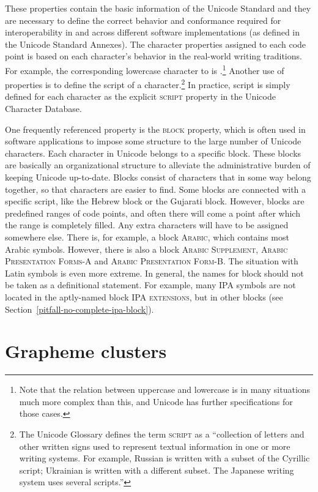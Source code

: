 These properties contain the basic information of the Unicode Standard and they
are necessary to define the correct behavior and conformance required for
interoperability in and across different software implementations (as defined in
the Unicode Standard Annexes). The character properties assigned to each code
point is based on each character's behavior in the real-world writing
traditions. For example, the corresponding lowercase character to  is
.\footnote{Note that the relation between uppercase and lowercase is in
many situations much more complex than this, and Unicode has further
specifications for those cases.} Another use of properties is to define the
script of a character.\footnote{The Unicode Glossary defines the term \textsc{script} as
a ``collection of letters and other written signs used to represent textual
information in one or more writing systems. For example, Russian is written with
a subset of the Cyrillic script; Ukrainian is written with a different subset.
The Japanese writing system uses several scripts.''} In practice, script is
simply defined for each character as the explicit \textsc{script} property in
the Unicode Character Database.

One frequently referenced property is the \textsc{block} property, which is
often used in software applications to impose some structure to the large number
of Unicode characters. Each character in Unicode belongs to a specific block.
These blocks are basically an organizational structure to alleviate the
administrative burden of keeping Unicode up-to-date. Blocks consist of
characters that in some way belong together, so that characters are easier to
find. Some blocks are connected with a specific script, like the Hebrew block or
the Gujarati block. However, blocks are predefined ranges of code points, and
often there will come a point after which the range is completely filled. Any
extra characters will have to be assigned somewhere else. There is, for example,
a block \textsc{Arabic}, which contains most Arabic symbols. However, there is
also a block \textsc{Arabic Supplement}, \textsc{Arabic Presentation Forms-A}
and \textsc{Arabic Presentation Form-B}. The situation with Latin symbols is
even more extreme. In general, the names for block should not be taken as a
definitional statement. For example, many IPA symbols are not located in the
aptly-named block \textsc{IPA extensions}, but in other blocks
(see Section~\ref{pitfall-no-complete-ipa-block}).

\section{Grapheme clusters}

